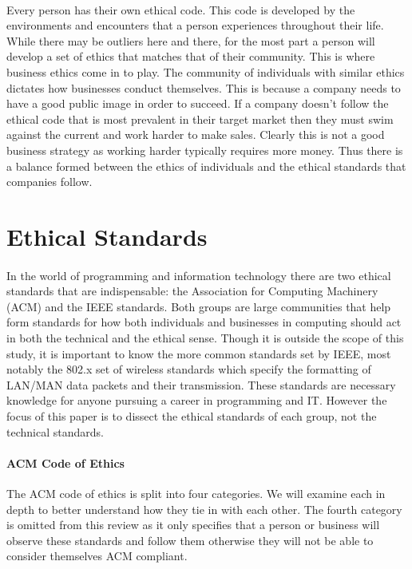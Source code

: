 \documentclass[a4paper,12pt]{article}
\begin{document}
\paragraph{}Every person has their own ethical code. This code is developed by the environments and encounters that a person experiences throughout their life. While there may be outliers here and there, for the most part a person will develop a set of ethics that matches that of their community. This is where business ethics come in to play. The community of individuals with similar ethics dictates how businesses conduct themselves. This is because a company needs to have a good public image in order to succeed. If a company doesn't follow the ethical code that is most prevalent in their target market then they must swim against the current and work harder to make sales. Clearly this is not a good business strategy as working harder typically requires more money. Thus there is a balance formed between the ethics of individuals and the ethical standards that companies follow.

\section*{Ethical Standards}
\paragraph{}In the world of programming and information technology there are two ethical standards that are indispensable: the Association for Computing Machinery (ACM) and the IEEE standards. Both groups are large communities that help form standards for how both individuals and businesses in computing should act in both the technical and the ethical sense. Though it is outside the scope of this study, it is important to know the more common standards set by IEEE, most notably the 802.x set of wireless standards which specify the formatting of LAN/MAN data packets and their transmission. These standards are necessary knowledge for anyone pursuing a career in programming and IT. However the focus of this paper is to dissect the ethical standards of each group, not the technical standards.
\paragraph{ACM Code of Ethics}The ACM code of ethics is split into four categories. We will examine each in depth to better understand how they tie in with each other. The fourth category is omitted from this review as it only specifies that a person or business will observe these standards and follow them otherwise they will not be able to consider themselves ACM compliant.
\end{document}
